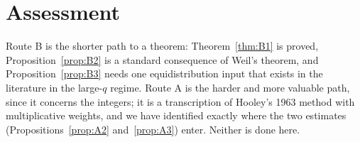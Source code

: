 \documentclass[11pt,a4paper]{article}
\begin{document}
\section{Assessment}

Route B is the shorter path to a theorem: Theorem~\ref{thm:B1} is proved, Proposition~\ref{prop:B2} is a
standard consequence of Weil's theorem, and Proposition~\ref{prop:B3} needs one equidistribution input
that exists in the literature in the large-$q$ regime. Route A is the harder and more valuable path,
since it concerns the integers; it is a transcription of Hooley's 1963 method with multiplicative weights,
and we have identified exactly where the two estimates (Propositions~\ref{prop:A2} and~\ref{prop:A3})
enter. Neither is done here.



\end{document}
